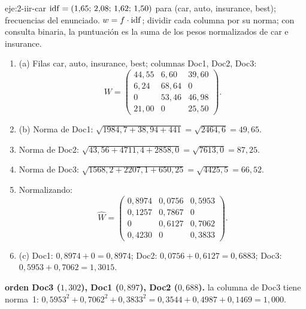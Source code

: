 \begin{solucion}{eje:2-iir-car}
\datos $\operatorname{idf}=(1{,}65;\,2{,}08;\,1{,}62;\,1{,}50)$ para (car, auto, insurance, best); frecuencias del enunciado.
\planteamiento $w=f\cdot\operatorname{idf}$; dividir cada columna por su norma; con consulta binaria, la puntuación es la suma de los pesos normalizados de car e insurance.
\pasos
\begin{enumerate}[label=\arabic*.]
  \item (a) Filas car, auto, insurance, best; columnas Doc1, Doc2, Doc3:
  \[
  W=\begin{pmatrix}44{,}55&6{,}60&39{,}60\\6{,}24&68{,}64&0\\0&53{,}46&46{,}98\\21{,}00&0&25{,}50\end{pmatrix}.
  \]
  \item (b) Norma de Doc1: $\sqrt{1984{,}7+38{,}94+441}=\sqrt{2464{,}6}=49{,}65$.
  \item Norma de Doc2: $\sqrt{43{,}56+4711{,}4+2858{,}0}=\sqrt{7613{,}0}=87{,}25$.
  \item Norma de Doc3: $\sqrt{1568{,}2+2207{,}1+650{,}25}=\sqrt{4425{,}5}=66{,}52$.
  \item Normalizando:
  \[
  \hat W=\begin{pmatrix}0{,}8974&0{,}0756&0{,}5953\\0{,}1257&0{,}7867&0\\0&0{,}6127&0{,}7062\\0{,}4230&0&0{,}3833\end{pmatrix}.
  \]
  \item (c) Doc1: $0{,}8974+0=0{,}8974$; Doc2: $0{,}0756+0{,}6127=0{,}6883$; Doc3: $0{,}5953+0{,}7062=1{,}3015$.
\end{enumerate}
\resultado \textbf{orden Doc3 ($1{,}302$), Doc1 ($0{,}897$), Doc2 ($0{,}688$).}
\comprobacion la columna de Doc3 tiene norma~1: $0{,}5953^{2}+0{,}7062^{2}+0{,}3833^{2}=0{,}3544+0{,}4987+0{,}1469=1{,}000$.
\end{solucion}

